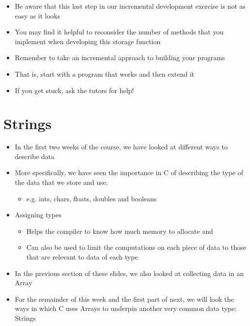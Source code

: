 \documentclass{beamer}
\begin{document}
 \begin{frame}
\begin{itemize}
\item Be aware that this last step in our incremental development exercise is not as easy as it looks
\item You may find it helpful to reconsider the number of methods that you implement when developing this storage function
\item Remember to take an incremental approach to building your programs
\item That is, start with a program that works and then extend it
\item If you get stuck, ask the tutors for help!
\end{itemize}
 \end{frame}

\section{Strings}
\begin{frame}
\begin{itemize}

\item {\color{black}
In the first two weeks of the course, we have looked at different ways to describe data}
\item {\color{black}
More specifically, we have seen the importance in C of describing the type of the data that we store and use.}

\begin{itemize}
\item {\color{black}
e.g. ints, chars, floats, doubles and booleans}
\end{itemize}
\item {\color{black}
Assigning types }

\begin{itemize}
\item {\color{black}
Helps the compiler to know how much memory to allocate and}
\item {\color{black}
Can also be used to limit the computations on each piece of data to those that are relevant to data of each type}
\end{itemize}
\end{itemize}
\end{frame}


\begin{frame}
\begin{itemize}
\item {\color{black}
In the previous section of these slides, we also looked at collecting data in an Array}
\item {\color{black}
For the remainder of this week and the first part of next, we will look the ways in which C uses Arrays to underpin another very common data type: Strings }
\end{itemize}
\end{frame}
\end{document}
